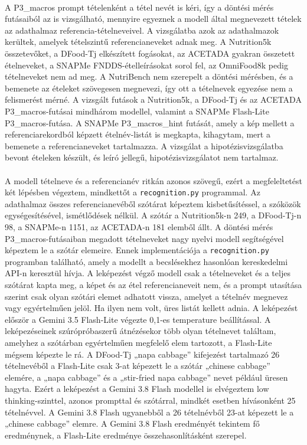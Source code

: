 \paragraph{}A P3\_macros prompt tételenként a tétel nevét is kéri, így a döntési mérés 
futásaiból az is vizsgálható, mennyire egyeznek a modell által megnevezett tételek az 
adathalmaz referencia-tételneveivel. A vizsgálatba azok az adathalmazok kerültek, amelyek 
tételszintű referencianeveket adnak meg. A Nutrition5k összetevőket, a DFood-Tj elkészített fogásokat, 
az ACETADA gyakran összetett ételneveket, a SNAPMe FNDDS-ételleírásokat 
sorol fel, az OmniFood8k pedig tételneveket nem ad meg. A NutriBench nem szerepelt a döntési 
mérésben, és a bemenete az ételeket szövegesen megnevezi, így ott a tételnevek egyezése nem a 
felismerést mérné. A vizsgált futások a Nutrition5k, a DFood-Tj és az ACETADA P3\_macros-futásai mindhárom modellel, 
valamint a SNAPMe Flash-Lite P3\_macros-futása. A SNAPMe P3\_macros\_hint futását, amely a kép mellett a referenciarekordból képzett 
ételnév-listát is megkapta, kihagytam, mert a bemenete a referencianeveket tartalmazza. A vizsgálat a hipotézisvizsgálatba bevont ételeken 
készült, és leíró jellegű, hipotézisvizsgálatot nem tartalmaz.

\paragraph{}A modell tételneve és a referencianév ritkán azonos szövegű, ezért a 
megfeleltetést két lépésben végeztem, mindkettőt a \texttt{recognition.py} programmal. Az 
adathalmaz összes referencianevéből szótárat képeztem kisbetűsítéssel, a szóközök 
egységesítésével, ismétlődések nélkül. A szótár a Nutrition5k-n 249, a DFood-Tj-n 98, a 
SNAPMe-n 1151, az ACETADA-n 181 elemből állt. A döntési mérés P3\_macros-futásaiban megadott 
tételneveket nagy nyelvi modell segítségével képeztem le a szótár elemeire. Ennek implementációja a 
\texttt{recognition.py} programban található, amely a modellt a becslésekhez hasonlóan kereskedelmi API-n keresztül hívja. A leképezést végző modell csak a tételneveket és 
a teljes szótárat kapta meg, a képet és az étel referencianeveit nem, és a prompt utasítása szerint csak olyan szótári 
elemet adhatott vissza, amelyet a tételnév megnevez vagy egyértelműen jelöl. Ha ilyen nem volt, 
üres listát kellett adnia. A leképezést először a Gemini 3.5 Flash-Lite végezte 
0,1-es temperature beállítással. A leképezéseinek szúrópróbaszerű átnézésekor több olyan tételnevet találtam, amelyhez a 
szótárban egyértelműen megfelelő elem tartozott, a Flash-Lite mégsem képezte le rá. A 
DFood-Tj „napa cabbage” kifejezést tartalmazó 26 tételnevéből a Flash-Lite csak 3-at 
képezett le a szótár „chinese cabbage” elemére, a „napa cabbage” és a „stir-fried napa 
cabbage” nevet például üresen hagyta. Ezért a leképezést a Gemini 3.8 Flash modellel is 
elvégeztem low thinking-szinttel, azonos prompttal és szótárral, mindkét esetben hívásonként 
25 tételnévvel. A Gemini 3.8 Flash ugyanebből a 26 tételnévből 23-at képezett le a „chinese 
cabbage” elemre. A Gemini 3.8 Flash eredményét tekintem fő eredménynek, a Flash-Lite 
eredménye összehasonlításként szerepel.


